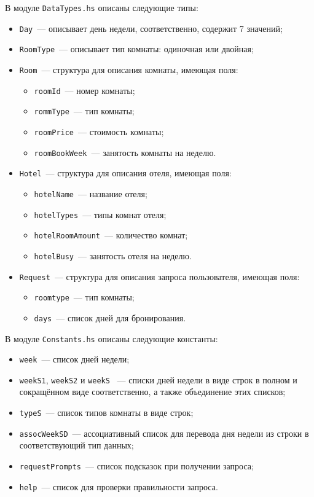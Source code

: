 \documentclass[oneside,final,14pt]{extarticle}
\begin{document}
В модуле \texttt{DataTypes.hs} описаны следующие типы:
\begin{itemize}
    \item \texttt{Day}~--- описывает день недели, соответственно, 
    содержит 7 значений;
    \item \texttt{RoomType}~--- описывает тип комнаты: одиночная или двойная;
    \item \texttt{Room}~--- структура для описания комнаты, имеющая поля:
    \begin{itemize}
        \item \texttt{roomId}~--- номер комнаты;
        \item \texttt{rommType}~--- тип комнаты;
        \item \texttt{roomPrice}~--- стоимость комнаты;
        \item \texttt{roomBookWeek}~--- занятость комнаты на неделю.
    \end{itemize}
    \item \texttt{Hotel}~--- структура для описания отеля, имеющая поля:
    \begin{itemize}   
        \item \texttt{hotelName}~--- название отеля;
        \item \texttt{hotelTypes}~--- типы комнат отеля;
        \item \texttt{hotelRoomAmount}~--- количество комнат;
        \item \texttt{hotelBusy}~--- занятость отеля на неделю.
    \end{itemize}
    \item \texttt{Request}~--- структура для описания запроса пользователя, имеющая поля:
    \begin{itemize}  
        \item \texttt{roomtype}~--- тип комнаты;
        \item \texttt{days}~--- список дней для бронирования.
    \end{itemize}
\end{itemize}

В модуле \texttt{Constants.hs} описаны следующие константы:
\begin{itemize}
    \item \texttt{week}~--- список дней недели;
    \item \texttt{weekS1}, \texttt{weekS2} и \texttt{weekS} ~--- списки 
    дней недели в виде строк в полном и сокращённом 
    виде соответственно, а также объединение этих списков;
    \item \texttt{typeS}~--- список типов комнаты в виде строк;
    \item \texttt{assocWeekSD}~--- ассоциативный список для перевода 
    дня недели из строки в соответствующий тип данных;
    \item \texttt{requestPrompts}~--- список подсказок при получении запроса;
    \item \texttt{help}~--- список для проверки правильности запроса.
\end{itemize}
\end{document}
